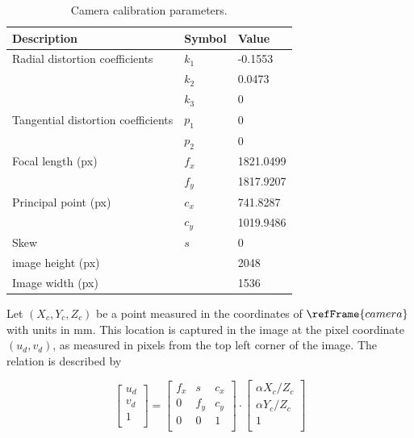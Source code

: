 \documentclass[11pt]{article}
\begin{document}
\begin{table}[!h]
    \centering
    \begin{tabular}{lll}
        \hline
        Description & Symbol & Value\\
        \hline
                Radial distortion coefficients
                & $k_1$ & -0.1553\\
                & $k_2$ & 0.0473\\
                & $k_3$ & 0\\
                Tangential distortion coefficients
                & $p_1$ & 0\\
                & $p_2$ & 0\\
                Focal length (px)
                & $f_x$ & 1821.0499\\
                & $f_y$ & 1817.9207\\
                Principal point (px)
                & $c_x$ & 741.8287\\
                & $c_y$ & 1019.9486\\
                Skew
                & $s$ & 0\\
                image height (px)
                & & 2048\\
                Image width (px)
                & & 1536\\
        \hline
        \end{tabular}
    \caption{Camera calibration parameters.}
    \label{tb:CameraParams}
\end{table}

Let $(X_c, Y_c, Z_c)$ be a point measured in the coordinates of $\refFrame{camera}$ with units in mm. This location is captured in the image at the pixel coordinate $(u_d,v_d)$, as measured in pixels from the top left corner of the image. The relation is described by

\begin{equation}
    \begin{bmatrix}
        u_d\\
        v_d\\
        1\\
    \end{bmatrix}
    =
    \begin{bmatrix}
        f_x & s & c_x\\
        0 & f_y & c_y\\
        0 & 0 & 1\\
    \end{bmatrix}
    \cdot
    \begin{bmatrix}
        \alpha X_c/Z_c\\
        \alpha Y_c/Z_c\\
        1\\
    \end{bmatrix}
\end{equation}
\end{document}
